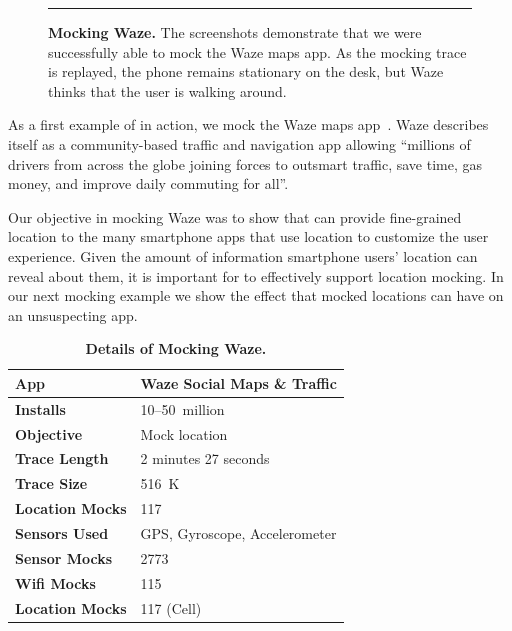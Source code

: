 \begin{figure}[t]
\caption{\textbf{Mocking Waze.} The screenshots demonstrate that we were
successfully able to mock the Waze maps app. As the mocking trace is
replayed, the phone remains stationary on the desk, but Waze thinks that the
user is walking around.}

\vspace*{0.1in}
\hrule
\vspace*{-0.15in}

\label{fig-mocking-waze}

\end{figure}

As a first example of \PocketMocker{} in action, we mock the Waze maps
app~\cite{waze-playstore-url}. Waze describes itself as a community-based
traffic and navigation app allowing ``millions of drivers from across the
globe joining forces to outsmart traffic, save time, gas money, and improve
daily commuting for all''.

Our objective in mocking Waze was to show that \PocketMocker{} can provide
fine-grained location to the many smartphone apps that use location to
customize the user experience. Given the amount of information smartphone
users' location can reveal about them, it is important for \PocketMocker{} to
effectively support location mocking. In our next mocking example we show the
effect that mocked locations can have on an unsuspecting app.

\begin{table}
\vspace*{-0.2in}
{\small
\begin{tabularx}{0.6\textwidth}{lX}
\textbf{App} & Waze Social Maps \& Traffic \\ \toprule
\textbf{Installs} & 10--50~million \\
\textbf{Objective} & Mock location \\ \midrule
\textbf{Trace Length} & 2 minutes 27 seconds \\
\textbf{Trace Size} & 516~K \\
\textbf{Location Mocks} & 117 \\
\textbf{Sensors Used} & {\small GPS, Gyroscope, Accelerometer} \\
\textbf{Sensor Mocks} & 2773 \\
\textbf{Wifi Mocks} & 115 \\
\textbf{Location Mocks} & 117 (Cell) \\
\end{tabularx}

\caption{\textbf{Details of Mocking Waze.}}

\label{table-mocking-waze}
}
\vspace*{-0.2in}
\end{table}


